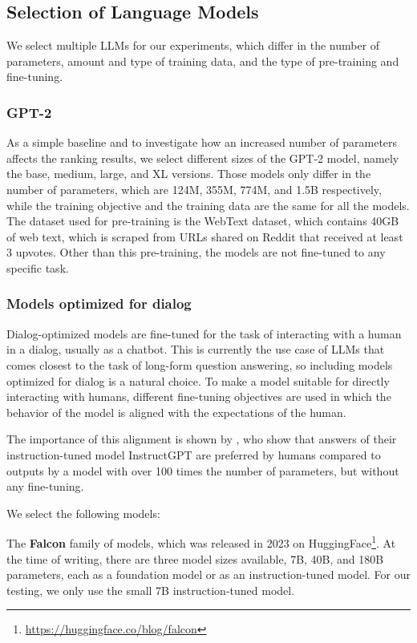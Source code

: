 \subsection{Selection of Language Models}
We select multiple LLMs for our experiments, which differ in the number of parameters, amount and type of training data, and the type of pre-training and fine-tuning.

\subsubsection{GPT-2}
As a simple baseline and to investigate how an increased number of parameters affects the ranking results, we select different sizes of the GPT-2 model, namely the base, medium, large, and XL versions.
Those models only differ in the number of parameters, which are 124M, 355M, 774M, and 1.5B respectively, while the training objective and the training data are the same for all the models.
The dataset used for pre-training is the WebText dataset, which contains 40GB of web text, which is scraped from URLs shared on Reddit that received at least 3 upvotes.
Other than this pre-training, the models are not fine-tuned to any specific task.

\subsubsection{Models optimized for dialog}\label{sec:dialog-models}
Dialog-optimized models are fine-tuned for the task of interacting with a human in a dialog, usually as a chatbot.
This is currently the use case of LLMs that comes closest to the task of long-form question answering, so including models optimized for dialog is a natural choice.
To make a model suitable for directly interacting with humans, different fine-tuning objectives are used in which the behavior of the model is aligned with the expectations of the human.

The importance of this alignment is shown by \cite{ouyang:2022:Training}, who show that answers of their instruction-tuned model InstructGPT are preferred by humans compared to outputs by a model with over 100 times the number of parameters, but without any fine-tuning.

We select the following models:

The \textbf{Falcon} family of models, which was released in 2023 on HuggingFace\footnote{\url{https://huggingface.co/blog/falcon}}.
At the time of writing, there are three model sizes available, 7B, 40B, and 180B parameters, each as a foundation model or as an instruction-tuned model.
For our testing, we only use the small 7B instruction-tuned model.

